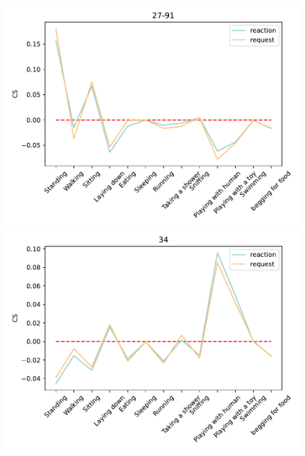 \begin{figure}[ht]
\begin{minipage}[b]{.3\linewidth}
		\end{minipage}
		
				\begin{minipage}[b]{.3\linewidth}
			\centering
			\includegraphics[width=0.99\linewidth]{./35word/27-91.pdf}
		\end{minipage}
		\begin{minipage}[b]{.3\linewidth}
			\centering
			\includegraphics[width=0.99\linewidth]{./35word/34.pdf}
		\end{minipage}
		\begin{minipage}[b]{.3\linewidth}
			\centering

\end{minipage}
\end{figure}
